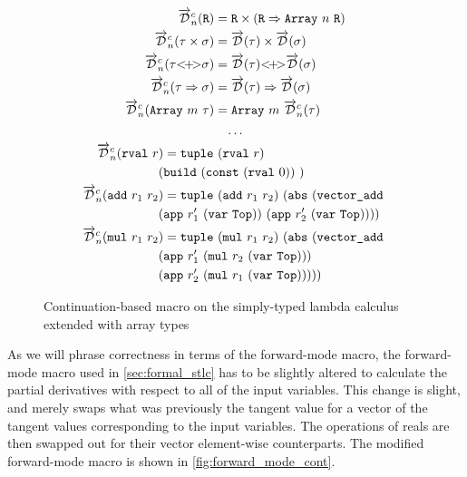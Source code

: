  \begin{figure}
    \centering
    \begin{gather*}
      \begin{aligned}
        \overrightarrow{\mathcal{D}}^c_n(\texttt{R}) &= \texttt{R} \times (\texttt{R} \Rightarrow \texttt{Array}\ n\ \texttt{R}) \\
        \overrightarrow{\mathcal{D}}^c_n(\tau \times \sigma) &= \overrightarrow{\mathcal{D}}(\tau) \times \overrightarrow{\mathcal{D}}(\sigma) \\
        \overrightarrow{\mathcal{D}}^c_n(\tau {<}\!{+}\!{>} \sigma) &= \overrightarrow{\mathcal{D}}(\tau) {<}\!{+}\!{>} \overrightarrow{\mathcal{D}}(\sigma) \\
        \overrightarrow{\mathcal{D}}^c_n(\tau \Rightarrow \sigma) &= \overrightarrow{\mathcal{D}}(\tau) \Rightarrow \overrightarrow{\mathcal{D}}(\sigma) \\
        \overrightarrow{\mathcal{D}}^c_n(\texttt{Array}\ m\ \tau) &= \texttt{Array}\ m\ \overrightarrow{\mathcal{D}}^c_n(\tau) \\
      \end{aligned}
      \\
      \begin{gathered}
        \dots \\
        \begin{aligned}
        \overrightarrow{\mathcal{D}}^c_n(\texttt{rval}\ r&) = \texttt{tuple}\ (\texttt{rval}\ r)\ \\
          &{(\texttt{build}\ (\texttt{const}\ (\texttt{rval}\ 0))\ )} \\
        \overrightarrow{\mathcal{D}}^c_n(\texttt{add}\ r_1\ r_2&) = \texttt{tuple}\ (\texttt{add}\ r_1\ r_2)\ (\texttt{abs}\ (\texttt{vector\_add}\  \\
          &(\texttt{app}\ r_1'\ (\texttt{var}\ \texttt{Top}))\ (\texttt{app}\ r_2'\ (\texttt{var}\ \texttt{Top})))) \\
        \overrightarrow{\mathcal{D}}^c_n(\texttt{mul}\ r_1\ r_2&) = \texttt{tuple}\ (\texttt{mul}\ r_1\ r_2)\ (\texttt{abs}\ (\texttt{vector\_add}\  \\
          &(\texttt{app}\ r_1'\ (\texttt{mul}\ r_2\ (\texttt{var}\ \texttt{Top})))\  \\
          &(\texttt{app}\ r_2'\ (\texttt{mul}\ r_1\ (\texttt{var}\ \texttt{Top}))))) \\
        \end{aligned}
      \end{gathered}
    \end{gather*}
    \caption{Continuation-based macro on the simply-typed lambda calculus extended with array types}
    \label{fig:continuation_macro}
  \end{figure}

  As we will phrase correctness in terms of the forward-mode macro, the forward-mode macro used in \cref{sec:formal_stlc} has to be slightly altered to calculate the partial derivatives with respect to all of the input variables.
  This change is slight, and merely swaps what was previously the tangent value for a vector of the tangent values corresponding to the input variables.
  The operations of reals are then swapped out for their vector element-wise counterparts.
  The modified forward-mode macro is shown in \cref{fig:forward_mode_cont}.

